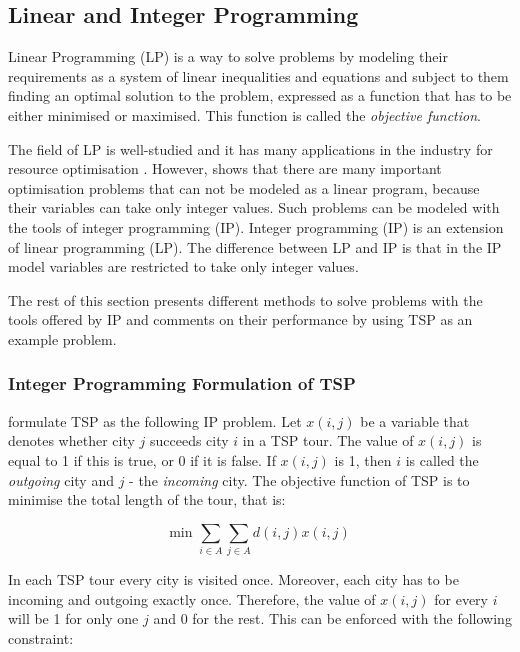 \documentclass{mprop}
\theoremstyle{definition}
\begin{document}
\subsection{Linear and Integer Programming}
\label{ip}

Linear Programming (LP) is a way to solve problems by modeling their requirements as a system of linear inequalities and equations and subject to them finding an optimal solution to the problem, expressed as a function that has to be either minimised or maximised. This function is called the \textit{objective function}.

The field of LP is well-studied \citep{Kantorovich60,DantzigLp63} and it has many applications in the industry for resource optimisation \citep{Jacovkis89,Garvin57}. However, \citet{Dantzig60} shows that there are many important optimisation problems that can not be modeled as a linear program, because their variables can take only integer values. Such problems can be modeled with the tools of integer programming (IP). Integer programming (IP) is an extension of linear programming (LP). The difference between LP and IP is that in the IP model variables are restricted to take only integer values.

The rest of this section presents different methods to solve problems with the tools offered by IP and comments on their performance by using TSP as an example problem.

\subsubsection{Integer Programming Formulation of TSP}
\label{sec:iptspformulation}

\citet{Dantzig54} formulate TSP as the following IP problem. Let $x(i,j)$ be a variable that denotes whether city $j$ succeeds city $i$ in a TSP tour. The value of $x(i,j)$ is equal to 1 if this is true, or 0 if it is false. If $x(i,j)$ is 1, then $i$ is called the \textit{outgoing} city and $j$ - the \textit{incoming} city. The objective function of TSP is to minimise the total length of the tour, that is:

\begin{equation}
\label{eq:objfunc}
\textrm{min } \sum_{i\in A}\sum_{j\in A} d(i,j)x(i,j)
\end{equation}

In each TSP tour every city is visited once. Moreover, each city has to be incoming and outgoing exactly once. Therefore, the value of $x(i,j)$ for every $i$ will be 1 for only one $j$ and 0 for the rest. This can be enforced with the following constraint:
\end{document}
